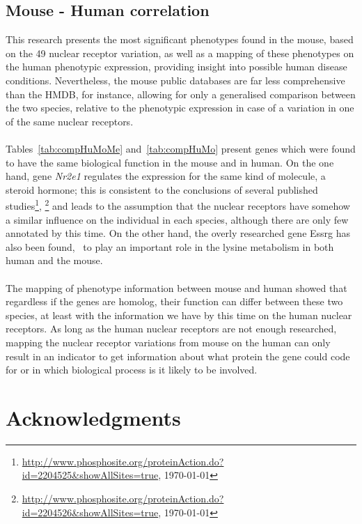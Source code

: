 \documentclass[fleqn,11pt]{SelfArx}
\begin{document}
\subsection{Mouse - Human correlation}

This research presents the most significant phenotypes found in the mouse, based on the 49 nuclear receptor variation, as well as a mapping of these phenotypes on the human phenotypic expression, providing insight into possible human disease conditions. Nevertheless, the mouse public databases are far less comprehensive than the HMDB, for instance, allowing for only a generalised comparison between the two species, relative to the phenotypic expression in case of a variation in one of the same nuclear receptors.
~~~~~~~\\
~~~~~~~\\
Tables~\ref{tab:compHuMoMe} and~\ref{tab:compHuMo} present genes which were found to have the same biological function in the mouse and in human. On the one hand, gene \textit{Nr2e1} regulates the expression for the same kind of molecule, a steroid hormone; this is consistent to the conclusions of several published studies\footnote{\url{http://www.phosphosite.org/proteinAction.do?id=2204525&showAllSites=true}, \today}, \footnote{\url{http://www.phosphosite.org/proteinAction.do?id=2204526&showAllSites=true}, \today}  and leads to the assumption that the nuclear receptors have somehow a similar influence on the individual in each species, although there are only few annotated by this time. On the other hand, the overly researched gene Essrg has also been found,~\cite{esrrg2_discussion} to play an important role in the lysine metabolism in both human and the mouse.
~~~~~~~\\
~~~~~~~\\
The mapping of phenotype information between mouse and human showed that regardless if the genes are homolog, their function can differ between these two species, at least with the information we have by this time on the human nuclear receptors. As long as the human nuclear receptors are not enough researched, mapping the nuclear receptor variations from mouse on the human can only result in an indicator to get information about what protein the gene could code for or in which biological process is it likely to be involved.


\section{Acknowledgments} %
\end{document}
